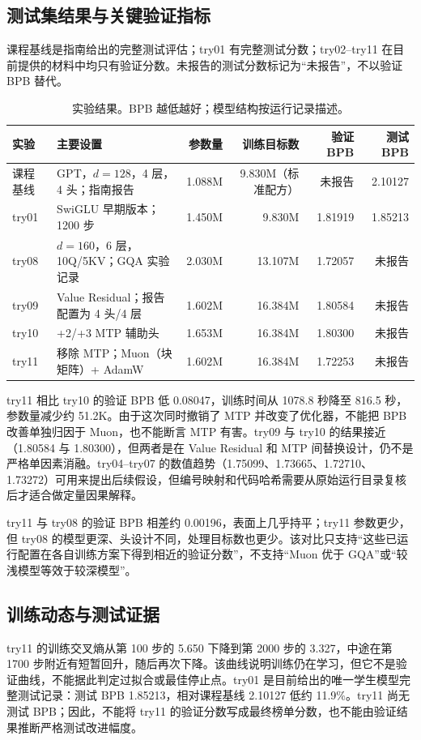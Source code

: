 \documentclass[UTF8,a4paper,11pt]{ctexart}
\begin{document}
\subsection{测试集结果与关键验证指标}
课程基线是指南给出的完整测试评估；try01 有完整测试分数；try02--try11 在目前提供的材料中均只有验证分数。未报告的测试分数标记为“未报告”，不以验证 BPB 替代。

\begin{table}[htbp]
\centering\small
\caption{实验结果。BPB 越低越好；模型结构按运行记录描述。}
\label{tab:results}
\begin{tabularx}{\textwidth}{@{}l X r r r r@{}}
\toprule
实验 & 主要设置 & 参数量 & 训练目标数 & 验证 BPB & 测试 BPB \\
\midrule
课程基线 & GPT，$d=128$，4 层，4 头；指南报告 & 1.088M & 9.830M（标准配方） & 未报告 & 2.10127 \\
try01 & SwiGLU 早期版本；1200 步 & 1.450M & 9.830M & 1.81919 & 1.85213 \\
try08 & $d=160$，6 层，10Q/5KV；GQA 实验记录 & 2.030M & 13.107M & 1.72057 & 未报告 \\
try09 & Value Residual；报告配置为 4 头/4 层 & 1.602M & 16.384M & 1.80584 & 未报告 \\
try10 & +2/+3 MTP 辅助头 & 1.653M & 16.384M & 1.80300 & 未报告 \\
try11 & 移除 MTP；Muon（块矩阵）+ AdamW & 1.602M & 16.384M & 1.72253 & 未报告 \\
\bottomrule
\end{tabularx}
\end{table}

try11 相比 try10 的验证 BPB 低 0.08047，训练时间从 1078.8 秒降至 816.5 秒，参数量减少约 51.2K。由于这次同时撤销了 MTP 并改变了优化器，不能把 BPB 改善单独归因于 Muon，也不能断言 MTP 有害。try09 与 try10 的结果接近（1.80584 与 1.80300），但两者是在 Value Residual 和 MTP 间替换设计，仍不是严格单因素消融。try04--try07 的数值趋势（1.75099、1.73665、1.72710、1.73272）可用来提出后续假设，但编号映射和代码哈希需要从原始运行目录复核后才适合做定量因果解释。

try11 与 try08 的验证 BPB 相差约 0.00196，表面上几乎持平；try11 参数更少，但 try08 的模型更深、头设计不同，处理目标数也更少。该对比只支持“这些已运行配置在各自训练方案下得到相近的验证分数”，不支持“Muon 优于 GQA”或“较浅模型等效于较深模型”。

\subsection{训练动态与测试证据}
try11 的训练交叉熵从第 100 步的 5.650 下降到第 2000 步的 3.327，中途在第 1700 步附近有短暂回升，随后再次下降。该曲线说明训练仍在学习，但它不是验证曲线，不能据此判定过拟合或最佳停止点。try01 是目前给出的唯一学生模型完整测试记录：测试 BPB 1.85213，相对课程基线 2.10127 低约 11.9\%。try11 尚无测试 BPB；因此，不能将 try11 的验证分数写成最终榜单分数，也不能由验证结果推断严格测试改进幅度。
\end{document}
